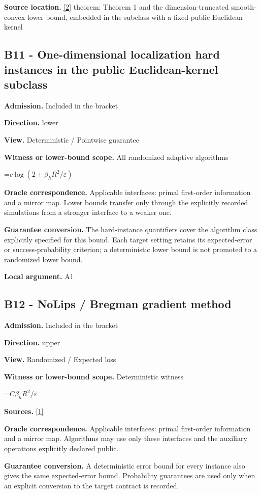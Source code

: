 \documentclass[10pt,a4paper]{article}
\newcommand{\AtlasMath}[1]{\par\begingroup\centering\setbox0=\hbox{$\displaystyle #1$}\ifdim\wd0>1.4\linewidth\typeout{ATLAS WIDE FORMULA: \the\wd0}\fi\ifdim\wd0>\linewidth\resizebox{\linewidth}{!}{\box0}\else\box0\fi\par\endgroup}
\begin{document}
\textbf{Source location.} \href{https://arxiv.org/pdf/2609.10874}{[2]} theorem: Theorem 1 and the dimension-truncated smooth-convex lower bound, embedded in the subclass with a fixed public Euclidean kernel

\subsection{B11 - One-dimensional localization hard instances in the public Euclidean-kernel subclass}
\textbf{Admission.} Included in the bracket

\textbf{Direction.} lower

\textbf{View.} Deterministic / Pointwise guarantee

\textbf{Witness or lower-bound scope.} All randomized adaptive algorithms

\AtlasMath{c\log(2+\beta_hR^2/\varepsilon)}
\textbf{Oracle correspondence.} Applicable interfaces: primal first-order information and a mirror map. Lower bounds transfer only through the explicitly recorded simulations from a stronger interface to a weaker one.

\textbf{Guarantee conversion.} The hard-instance quantifiers cover the algorithm class explicitly specified for this bound. Each target setting retains its expected-error or success-probability criterion; a deterministic lower bound is not promoted to a randomized lower bound.

\textbf{Local argument.} A1

\subsection{B12 - NoLips / Bregman gradient method}
\textbf{Admission.} Included in the bracket

\textbf{Direction.} upper

\textbf{View.} Randomized / Expected loss

\textbf{Witness or lower-bound scope.} Deterministic witness

\AtlasMath{C\beta_hR^2/\varepsilon}
\textbf{Sources.} \href{https://arxiv.org/pdf/1911.08510v3}{[1]}

\textbf{Oracle correspondence.} Applicable interfaces: primal first-order information and a mirror map. Algorithms may use only these interfaces and the auxiliary operations explicitly declared public.

\textbf{Guarantee conversion.} A deterministic error bound for every instance also gives the same expected-error bound. Probability guarantees are used only when an explicit conversion to the target contract is recorded.
\end{document}

